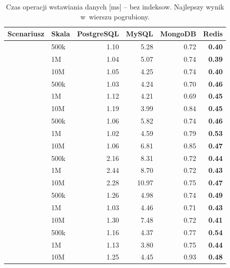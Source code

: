 \begin{table}[H]
\centering
\caption{Czas operacji wstawiania danych [ms] -- bez indeksow. Najlepszy wynik w~wierszu pogrubiony.}
\label{tab:create_no}
\small
\begin{tabular}{@{}llrrrr@{}}
\toprule
\textbf{Scenariusz} & \textbf{Skala} & \textbf{PostgreSQL} & \textbf{MySQL} & \textbf{MongoDB} & \textbf{Redis} \\
\midrule
{}
 & 500k & 1.10 & 5.28 & 0.72 & \textbf{0.40} \\
 & 1M & 1.04 & 5.07 & 0.74 & \textbf{0.39} \\
 & 10M & 1.05 & 4.25 & 0.74 & \textbf{0.40} \\
\midrule
{}
 & 500k & 1.03 & 4.24 & 0.70 & \textbf{0.46} \\
 & 1M & 1.12 & 4.21 & 0.69 & \textbf{0.45} \\
 & 10M & 1.19 & 3.99 & 0.84 & \textbf{0.45} \\
\midrule
{}
 & 500k & 1.06 & 5.82 & 0.74 & \textbf{0.46} \\
 & 1M & 1.02 & 4.59 & 0.79 & \textbf{0.53} \\
 & 10M & 1.06 & 6.81 & 0.85 & \textbf{0.47} \\
\midrule
{}
 & 500k & 2.16 & 8.31 & 0.72 & \textbf{0.44} \\
 & 1M & 2.44 & 8.70 & 0.72 & \textbf{0.43} \\
 & 10M & 2.28 & 10.97 & 0.75 & \textbf{0.47} \\
\midrule
{}
 & 500k & 1.26 & 4.98 & 0.74 & \textbf{0.49} \\
 & 1M & 1.03 & 4.46 & 0.71 & \textbf{0.43} \\
 & 10M & 1.30 & 7.48 & 0.72 & \textbf{0.41} \\
\midrule
{}
 & 500k & 1.16 & 4.37 & 0.77 & \textbf{0.54} \\
 & 1M & 1.13 & 3.80 & 0.75 & \textbf{0.44} \\
 & 10M & 1.25 & 4.45 & 0.93 & \textbf{0.48} \\
\bottomrule
\end{tabular}
\end{table}
